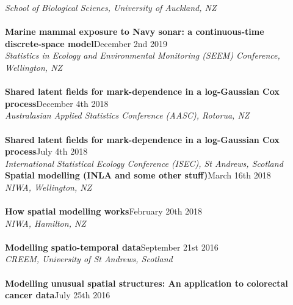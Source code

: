 \documentclass[10pt,letter]{article}
\begin{document}
                                     {\sl School of Biological Scienes, University of Auckland, NZ}\\
                                     \hdashrule[0.5ex]{4cm}{1pt}{1pt}\\
                                               {\textbf{Marine mammal exposure to Navy sonar: a continuous-time \\
                                                   discrete-space model}}\hfill December 2nd 2019\\
                                               {\sl Statistics in Ecology and Environmental Monitoring (SEEM) Conference, Wellington, NZ}\\
                                               \hdashrule[0.5ex]{4cm}{1pt}{1pt}\\
                                                         {\textbf{Shared latent fields for mark-dependence in a log-Gaussian Cox process}}\hfill December 4th 2018\\
                                                         {\sl Australasian Applied Statistics Conference (AASC), Rotorua, NZ}\\
 \hdashrule[0.5ex]{4cm}{1pt}{1pt}\\
{\textbf{Shared latent fields for mark-dependence in a log-Gaussian Cox process}}\hfill July 4th 2018\\
 {\sl International Statistical Ecology Conference (ISEC), St Andrews, Scotland}\\
 \newpage
 \noindent
{\textbf{Spatial modelling (INLA and some other stuff)}}\hfill March 16th 2018\\
 {\sl NIWA, Wellington, NZ}\\
 \hdashrule[0.5ex]{4cm}{1pt}{1pt}\\
{\textbf{How spatial modelling works}}\hfill February 20th 2018\\
 {\sl NIWA, Hamilton, NZ}\\
\hdashrule[0.5ex]{4cm}{1pt}{1pt}\\
{\textbf{Modelling spatio-temporal data}}\hfill September 21st 2016\\
 {\sl CREEM, University of St Andrews, Scotland}\\
 \hdashrule[0.5ex]{4cm}{1pt}{1pt}\\
 \noindent
{\textbf{Modelling unusual spatial structures: An application to colorectal cancer data}}\hfill July 25th 2016\\
\end{document}
